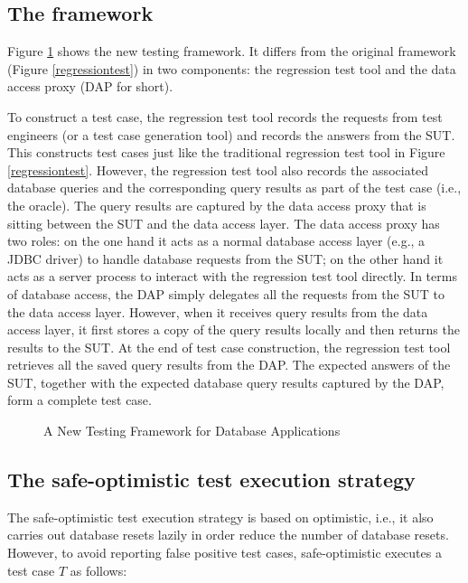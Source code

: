 \documentclass[authoryear,preprint,12pt]{elsarticle}
\begin{document}
 \subsection{The framework}
 
 Figure \ref{peda} shows the new testing framework.
 It differs from the original framework (Figure \ref{regressiontest}) in two components: 
 the regression test tool and 
 the data access proxy (DAP for short).


To construct a test case, the regression test tool records the requests from test engineers (or a test case generation tool)
and records the answers from the SUT.  This constructs test cases just
like the traditional regression test tool in Figure \ref{regressiontest}.
However, the regression test tool also records the associated database queries and the corresponding query results
as part of the test case (i.e., the oracle).
The query results are captured by the data access proxy that is
sitting between the SUT and the data access layer.
The data access proxy has two roles: on the one hand it acts as a normal database
access layer (e.g., a JDBC driver) to handle database requests from the
SUT; on the other hand it acts as a server process to interact
with the regression test tool directly.  
In terms of database access, the DAP simply delegates all the requests from the
SUT to the data access layer.  However, when it receives
query results from the data access layer, it first stores a copy of the query
results locally and then returns the results to the SUT.   At
the end of test case construction, the regression test tool retrieves all the
saved query results from the DAP.  The expected answers of the SUT, together
with the expected database query results captured by the DAP,
form a complete test case.  

\begin{figure}
\centering
{}
\caption{A New Testing Framework for Database Applications}
\label{peda}
\end{figure}


  \subsection{The {\sc safe-optimistic} test execution strategy}
  The {\sc safe-optimistic} test execution strategy is based on {\sc optimistic},
  i.e., it also carries out database resets lazily in order reduce the number of database resets.
  However, to avoid reporting false positive test cases, 
  {\sc safe-optimistic} executes a test case $T$ as follows:
\end{document}
